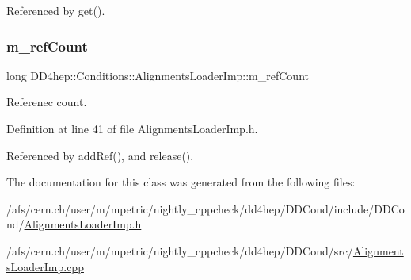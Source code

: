 Referenced by get().

\hypertarget{class_d_d4hep_1_1_conditions_1_1_alignments_loader_imp_a806e6a616a116ada0a4a9876c0cc1119}{}\label{class_d_d4hep_1_1_conditions_1_1_alignments_loader_imp_a806e6a616a116ada0a4a9876c0cc1119} 
\subsubsection{\texorpdfstring{m\+\_\+ref\+Count}{m\_refCount}}
{\footnotesize\ttfamily long D\+D4hep\+::\+Conditions\+::\+Alignments\+Loader\+Imp\+::m\+\_\+ref\+Count\hspace{0.3cm}{\ttfamily [protected]}}



Referenec count. 



Definition at line 41 of file Alignments\+Loader\+Imp.\+h.



Referenced by add\+Ref(), and release().



The documentation for this class was generated from the following files\+:\begin{DoxyCompactItemize}
\item 
/afs/cern.\+ch/user/m/mpetric/nightly\+\_\+cppcheck/dd4hep/\+D\+D\+Cond/include/\+D\+D\+Cond/\hyperlink{_alignments_loader_imp_8h}{Alignments\+Loader\+Imp.\+h}\item 
/afs/cern.\+ch/user/m/mpetric/nightly\+\_\+cppcheck/dd4hep/\+D\+D\+Cond/src/\hyperlink{_alignments_loader_imp_8cpp}{Alignments\+Loader\+Imp.\+cpp}\end{DoxyCompactItemize}

